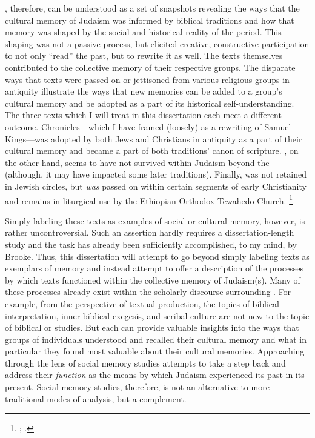 \rwb, therefore, can be understood as a set of snapshots revealing the ways that the cultural memory of \secondtemple Judaism was informed by biblical traditions and how that memory was shaped by the social and historical reality of the \secondtemple period. This shaping was not a passive process, but elicited creative, constructive participation to not only ``read'' the past, but to rewrite it as well. The texts themselves contributed to the collective memory of their respective groups. The disparate ways that \rwb texts were passed on or jettisoned from various religious groups in antiquity illustrate the ways that new memories can be added to a group's cultural memory and be adopted as a part of its historical self-understanding. The three texts which I will treat in this dissertation each meet a different outcome. Chronicles---which I have framed (loosely) as a rewriting of Samuel--Kings---was adopted by both Jews and Christians in antiquity as a part of their cultural memory and became a part of both traditions' canon of scripture. \GA, on the other hand, seems to have not survived within Judaism beyond the  (although, it may have impacted some later traditions). Finally, \jub was not retained in Jewish circles, but \emph{was} passed on within certain segments of early Christianity and remains in liturgical use by the Ethiopian Orthodox Tewahedo Church.%
    \footnote{%
        \Cite{baynes_mason-etal2012};
        \cite{asale_bt2016}.}

Simply labeling these \rwb texts as examples of social or cultural memory, however, is rather uncontroversial. Such an assertion hardly requires a dissertation-length study and the task has already been sufficiently accomplished, to my mind, by Brooke.%
    \autocite{brooke_zsengeller2014}
Thus, this dissertation will attempt to go beyond simply labeling \rwb texts as exemplars of memory and instead attempt to offer a description of the processes by which \rwb texts functioned within the collective memory of \secondtemple Judaism(s). Many of these processes already exist within the scholarly discourse surrounding \rwb. For example, from the perspective of textual production, the topics of biblical interpretation, inner-biblical exegesis, and scribal culture are not new to the topic of biblical or \qumran studies. But each can provide valuable insights into the ways that groups of individuals understood and recalled their cultural memory and what in particular they found most valuable about their cultural memories. Approaching \rwb through the lens of social memory studies attempts to take a step back and address their \emph{function} as the means by which \secondtemple Judaism experienced its past in its present. Social memory studies, therefore, is not an alternative to more traditional modes of analysis, but a complement. 


